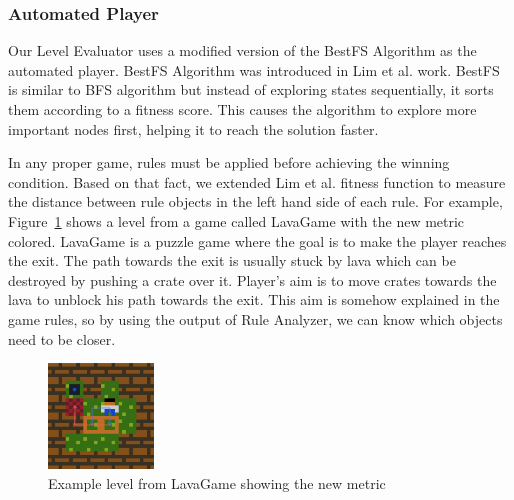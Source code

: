 \documentclass[letterpaper]{article}
\newcommand{\figref}[1]{Figure~\ref{Figure:#1}}
\begin{document}
\subsubsection{Automated Player}
Our Level Evaluator uses a modified version of the BestFS Algorithm as the automated player. BestFS Algorithm was introduced in Lim et al.\cite{puzzleScriptGeneration} work. BestFS is similar to BFS algorithm but instead of exploring states sequentially, it sorts them according to a fitness score. This causes the algorithm to explore more important nodes first, helping it to reach the solution faster.\\\par

In any proper game, rules must be applied before achieving the winning condition. Based on that fact, we extended Lim et al. fitness function to measure the distance between rule objects in the left hand side of each rule. For example, \figref{lavaGame} shows a level from a game called LavaGame with the new metric colored. LavaGame is a puzzle game where the goal is to make the player reaches the exit. The path towards the exit is usually stuck by lava which can be destroyed by pushing a crate over it. Player's aim is to move crates towards the lava to unblock his path towards the exit. This aim is somehow explained in the game rules, so by using the output of Rule Analyzer, we can know which objects need to be closer.

\begin{figure}[ht]
  	\centering
    \includegraphics[width=0.25\textwidth]{Images/lavaGame}
    \caption{Example level from LavaGame showing the new metric}
    \label{Figure:lavaGame}
\end{figure}
\end{document}
